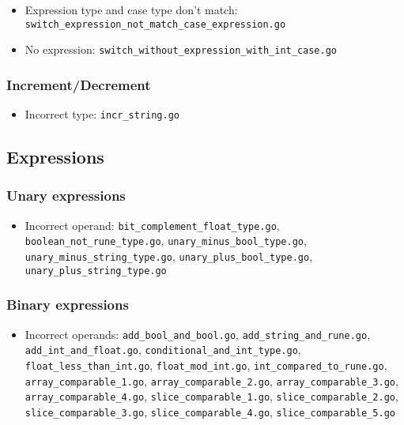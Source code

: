 \documentclass{article}
\begin{document}
\begin{itemize}
\item Expression type and case type don't match: \texttt{switch_expression_not_match_case_expression.go}
\item No expression: \texttt{switch_without_expression_with_int_case.go}
\end{itemize}

\subsubsection*{Increment/Decrement}

\begin{itemize}
\item Incorrect type: \texttt{incr_string.go}
\end{itemize}

\subsection*{Expressions}

\subsubsection*{Unary expressions}

\begin{itemize}
\item Incorrect operand: \texttt{bit_complement_float_type.go}, \texttt{boolean_not_rune_type.go}, \texttt{unary_minus_bool_type.go}, \texttt{unary_minus_string_type.go}, \texttt{unary_plus_bool_type.go}, \texttt{unary_plus_string_type.go}
\end{itemize}

\subsubsection*{Binary expressions}

\begin{itemize}
\item Incorrect operands: \texttt{add_bool_and_bool.go}, \texttt{add_string_and_rune.go}, \texttt{add_int_and_float.go}, \texttt{conditional_and_int_type.go}, \texttt{float_less_than_int.go}, \texttt{float_mod_int.go}, \texttt{int_compared_to_rune.go}, \texttt{array_comparable_1.go}, \texttt{array_comparable_2.go}, \texttt{array_comparable_3.go}, \texttt{array_comparable_4.go}, \texttt{slice_comparable_1.go}, \texttt{slice_comparable_2.go}, \texttt{slice_comparable_3.go}, \texttt{slice_comparable_4.go}, \texttt{slice_comparable_5.go}
\end{itemize}
\end{document}
